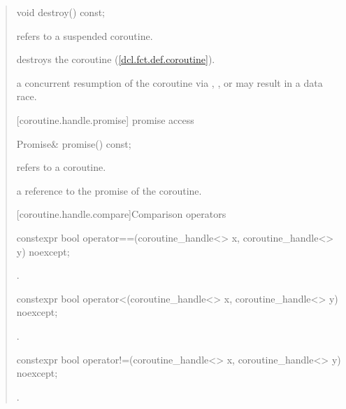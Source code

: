 \begin{quote}
\begin{itemdescr}
\end{itemdescr}

\begin{itemdecl}
  void destroy() const;
\end{itemdecl}
\begin{itemdescr}
  \pnum
  \precondition {} refers to a suspended coroutine.
  
  \pnum
  \effects destroys the coroutine (\ref{dcl.fct.def.coroutine}).
  
\pnum
  \sync a concurrent resumption of the coroutine via , , or  may result in a data race.
\end{itemdescr}

[coroutine.handle.promise]{ promise access}
\begin{itemdecl}
  Promise& promise() const;		
\end{itemdecl}

\begin{itemdescr}
  \pnum
  \precondition {} refers to a coroutine.
  
  \pnum
  \returns a reference to the promise of the coroutine.
\end{itemdescr}

[coroutine.handle.compare]{Comparison operators}

\begin{itemdecl}
  constexpr bool operator==(coroutine_handle<> x, coroutine_handle<> y) noexcept;
\end{itemdecl}

\begin{itemdescr}
  \pnum
  \returns {}.
\end{itemdescr}

\begin{itemdecl}
  constexpr bool operator<(coroutine_handle<> x, coroutine_handle<> y) noexcept;
\end{itemdecl}

\begin{itemdescr}
  \pnum
  \returns {}.
\end{itemdescr}

\begin{itemdecl}
  constexpr bool operator!=(coroutine_handle<> x, coroutine_handle<> y) noexcept;
\end{itemdecl}

\begin{itemdescr}
  \pnum
  \returns {}.
\end{itemdescr}


\end{quote}
